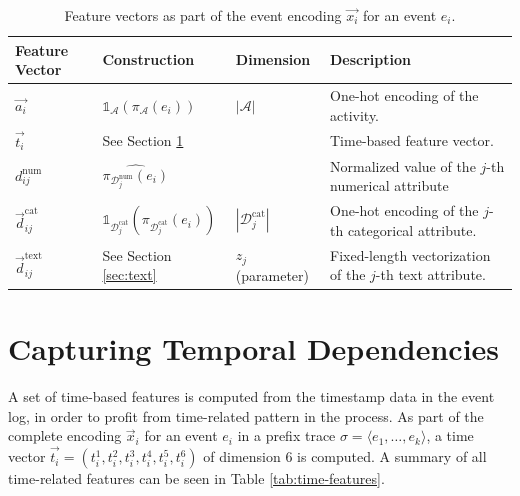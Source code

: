 \begin{table}[!tbp]
	\renewcommand{\arraystretch}{1.2}
	\setlength\tabcolsep{5pt}
	\begin{tabularx}{\textwidth}{
			>{\hsize=0.6\hsize}X
			>{\hsize=0.8\hsize}X
			>{\hsize=0.6\hsize}X
			>{\hsize=2.0\hsize}X
		}
		\toprule
		\textbf{Feature} \newline \textbf{Vector} & \textbf{Construction} &\textbf{Dimension} &  \textbf{Description} \\
		\midrule
		$\vec{a_i}$ &$\mathds{1}_\mathcal{A}(\pi_\mathcal{A}(e_i))$& $|\mathcal{A}|$& One-hot encoding of the activity. \\
		$\vec{t_i}$ & See Section \ref{sec:time} &6 & Time-based feature vector.\\
		$d_{ij}^\mathrm{num}$ &  $\widehat{\pi_{\mathcal{D}_j^\mathrm{num}}(e_i)} $ &1 & Normalized value of the $j$-th numerical attribute\\
		$\vec{d}_{ij}^\mathrm{cat}$ & $\mathds{1}_{\mathcal{D}_j^{\mathrm{cat}}}(\pi_{\mathcal{D}_j^\mathrm{cat}}(e_i))$&$|\mathcal{D}_j^\mathrm{cat}|$ & One-hot encoding of the $j$-th categorical attribute.\\
		$\vec{d}_{ij}^\mathrm{text}$ & See Section \ref{sec:text} & $z_j$ \newline (parameter) & Fixed-length vectorization of the $j$-th text attribute.\\
		\bottomrule
	\end{tabularx}
	\caption[Feature vectors as part of the event encoding]{Feature vectors as part of the event encoding $\vec{x_i}$ for an event $e_i$.}
	\label{tab:features}
\end{table}

\section{Capturing Temporal Dependencies}\label{sec:time}

A set of time-based features is computed from the timestamp data in the event log, in order to profit from time-related pattern in the process.
As part of the complete encoding $\vec{x}_i$ for an event $e_i$ in a prefix trace $\sigma = \langle e_1, \dots, e_k \rangle$, a time vector $\vec{t_i} = (t_i^1, t_i^2,t_i^3,t_i^4,t_i^5,t_i^6)$ of dimension 6 is computed.
A summary of all time-related features can be seen in Table \ref{tab:time-features}.

